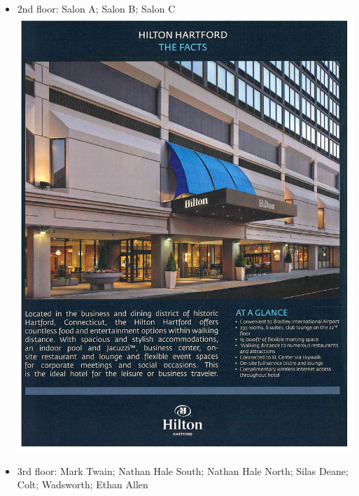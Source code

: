 \documentclass[10pt]{article}
\begin{document}
\vfill
\begin{itemize}
\item 2nd floor: Salon A; Salon B; Salon C
  \vfill
  \includegraphics[page=3, width=\textwidth, viewport=.23in 5.3in
  8.1in 9.07in, clip=true]{hilton.pdf}
  \vfill
\item 3rd floor: Mark Twain; Nathan Hale South; Nathan Hale North;
  Silas Deane; Colt; Wadsworth; Ethan Allen
  \vfill

\end{itemize}
\end{document}
